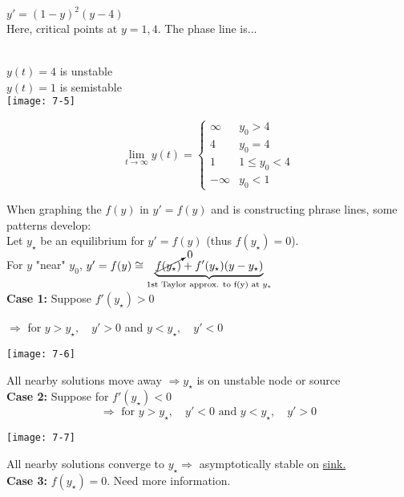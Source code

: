 \redhline\\
\begin{example-N}
	$y' = (1-y)^2 (y-4)$\\
	Here, critical points at $y=1,4$. The phase line is...
	\begin{center}
	\\$y(t) = 4$ is unstable\\
	$y(t) = 1$ is semistable	\\
	\texttt{[image: 7-5]}
	\end{center}
	\begin{equation*}
		\lim_{t \to \infty} y(t) = 
		\begin{cases}
			\infty & y_0 > 4\\
			4 & y_0 = 4\\
			1 & 1 \leq y_0 < 4\\
			-\infty & y_0 < 1
		\end{cases}
	\end{equation*}
\end{example-N}
When graphing the $f(y)$ in $y'=f(y)$ and is constructing phrase lines, some patterns develop:\\
Let $y_{\star}$ be an equilibrium for $y'=f(y)$ (thus $f(y_{\star}) = 0$).\\
For $y$ "near" $y_0$, $y' = f(y) \cong \underbrace{ \cancelto{0}{f(y_{\star})} + f'(y_{\star}) (y-y_{\star})}_{\text{1st Taylor approx. to f(y) at } y_{\star}}$\\
{\large \textbf{Case 1:}} Suppose $f'(y_{\star}) > 0$
\begin{center}
	$\Rightarrow$ for $y>y_{\star}, \quad y'>0$
and $y < y_{\star}, \quad y' < 0$
\end{center}
\begin{center}
	\texttt{[image: 7-6]}
\end{center}
All nearby solutions move away $\Rightarrow y_{\star}$ is on unstable node or source\\
{\large \textbf{Case 2:}} Suppose for $f'(y_{\star}) < 0$
\begin{equation*}
	\Rightarrow \text{ for } y>y_{\star}, \quad y'<0 \text{ and } y < y_{\star}, \quad y' > 0
\end{equation*}
\begin{center}
	\texttt{[image: 7-7]}
\end{center}
All nearby solutions converge to $y_{\star} \Rightarrow$ asymptotically stable on \underline{sink.}\\
{\large \textbf{Case 3:}} $f(y_{\star}) = 0$. Need more information.